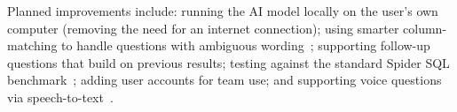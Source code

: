 \documentclass[11pt,a4paper]{article}
\begin{document}
Planned improvements include: running the AI model locally on the user's own computer
(removing the need for an internet connection); using smarter column-matching to handle
questions with ambiguous wording~\cite{devlin2019bert}; supporting follow-up questions
that build on previous results; testing against the standard Spider SQL
benchmark~\cite{yu2018spider}; adding user accounts for team use; and supporting voice
questions via speech-to-text~\cite{radford2022whisper}.



\end{document}
